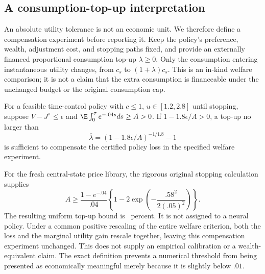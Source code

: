 \subsection{A consumption-top-up interpretation}\label{sec:topup}
An absolute utility tolerance is not an economic unit. We therefore define a compensation experiment before reporting it. Keep the policy's preference, wealth, adjustment cost, and stopping paths fixed, and provide an externally financed proportional consumption top-up $\lambda\geq0$. Only the consumption entering instantaneous utility changes, from $c_s$ to $(1+\lambda)c_s$. This is an in-kind welfare comparison; it is not a claim that the extra consumption is financeable under the unchanged budget or the original consumption cap.

\begin{proposition}\label{prop:topup}
For a feasible time-control policy with $c\leq1$, $u\in[1.2,2.8]$ until stopping, suppose $V-J^\pi\leq\epsilon$ and $\E\int_0^\tau e^{-.04s}ds\geq A>0$. If $1-1.8\epsilon/A>0$, a top-up no larger than
\begin{equation}
 \overline\lambda=(1-1.8\epsilon/A)^{-1/1.8}-1\label{eq:topup}
\end{equation}
is sufficient to compensate the certified policy loss in the specified welfare experiment.
\end{proposition}
For the fresh central-state price library, the rigorous original stopping calculation supplies
\[
 A\geq\frac{1-e^{-.04}}{.04}\left\{1-2\exp\!\left(-\frac{.58^2}{2(.05)^2}\right)\right\}.
\]
The resulting uniform top-up bound is \RFreshTopupPercent\ percent. It is not assigned to a neural policy. Under a common positive rescaling of the entire welfare criterion, both the loss and the marginal utility gain rescale together, leaving this compensation experiment unchanged. This does not supply an empirical calibration or a wealth-equivalent claim. The exact definition prevents a numerical threshold from being presented as economically meaningful merely because it is slightly below $.01$.
